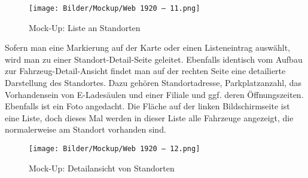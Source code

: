 \begin{figure}[!ht]
    \centering
    \texttt{[image: Bilder/Mockup/Web 1920 – 11.png]}
    \caption{Mock-Up: Liste an Standorten}
    \label{mu:standortliste}
\end{figure}


Sofern man eine Markierung auf der Karte oder einen Listeneintrag auswählt, wird man zu einer Standort-Detail-Seite geleitet. Ebenfalls identisch vom Aufbau zur Fahrzeug-Detail-Ansicht findet man auf der rechten Seite eine detailierte Darstellung des Standortes. Dazu gehören Standortadresse, Parkplatzanzahl, das Vorhandensein von E-Ladesäulen und einer Filiale und ggf. deren Öffnungszeiten. Ebenfalls ist ein Foto angedacht. Die Fläche auf der linken Bildschirmseite ist eine Liste, doch dieses Mal werden in dieser Liste alle Fahrzeuge angezeigt, die normalerweise am Standort vorhanden sind.  

\begin{figure}[!ht]
    \centering
    \texttt{[image: Bilder/Mockup/Web 1920 – 12.png]}
    \caption{Mock-Up: Detailansicht von Standorten}
    \label{mu:standortdetails}
\end{figure}